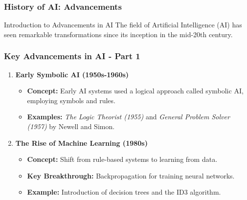 \documentclass{beamer}
\begin{document}
\begin{frame}[fragile]
    \frametitle{History of AI: Advancements}
    \begin{block}{Introduction to Advancements in AI}
        The field of Artificial Intelligence (AI) has seen remarkable transformations since its inception in the mid-20th century. 
    \end{block}
\end{frame}

\begin{frame}[fragile]
    \frametitle{Key Advancements in AI - Part 1}
    \begin{enumerate}
        \item \textbf{Early Symbolic AI (1950s-1960s)}
        \begin{itemize}
            \item \textbf{Concept:} Early AI systems used a logical approach called symbolic AI, employing symbols and rules.
            \item \textbf{Examples:} \textit{The Logic Theorist (1955)} and \textit{General Problem Solver (1957)} by Newell and Simon.
        \end{itemize}
        
        \item \textbf{The Rise of Machine Learning (1980s)}
        \begin{itemize}
            \item \textbf{Concept:} Shift from rule-based systems to learning from data.
            \item \textbf{Key Breakthrough:} Backpropagation for training neural networks.
            \item \textbf{Example:} Introduction of decision trees and the ID3 algorithm.
        \end{itemize}
    \end{enumerate}
\end{frame}
\end{document}
